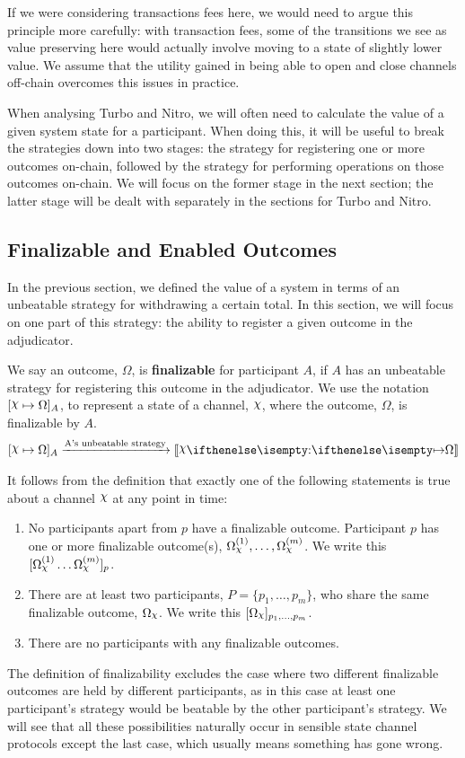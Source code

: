 \documentclass{article}
\begin{document}
If we were considering transactions fees here, we would need to argue this principle more
carefully: with transaction fees, some of the transitions we see as value preserving here
would actually involve moving to a state of slightly lower value. 
We assume that the utility gained in being able to open and close channels off-chain overcomes
this issues in practice.

When analysing Turbo and Nitro, we will often need to calculate the value of a given system
state for a participant.
When doing this, it will be useful to break the strategies down into two stages: the strategy
for registering one or more outcomes on-chain, followed by the strategy for performing operations
on those outcomes on-chain.
We will focus on the former stage in the next section; the latter stage will be dealt with
separately in the sections for Turbo and Nitro.

\subsection{Finalizable and Enabled Outcomes}

In the previous section, we defined the value of a system in terms of an unbeatable strategy
for withdrawing a certain total.
In this section, we will focus on one part of this strategy: the ability to register a given
outcome in the adjudicator.

We say an outcome, $\Omega$, is \textbf{finalizable} for participant $A$, if $A$ has an unbeatable
strategy for registering this outcome in the adjudicator.
We use the notation $\finalizable{\rchi}{\Omega}{A}$, to represent a state of a channel, $\rchi$,
where the outcome, $\Omega$, is finalizable by $A$.
\begin{align*}
  \finalizable{\rchi}{\Omega}{A} \xrightarrow{\text{A's unbeatable strategy}} \adj{\holds{\rchi}{}{}{\Omega}}
\end{align*}

It follows from the definition that exactly one of the following statements is true about
a channel $\rchi$ at any point in time:
\begin{enumerate}
  \item No participants apart from $p$ have a finalizable outcome.
        Participant $p$ has one or more finalizable outcome(s), $\Omega_\rchi^{(1)}, \dots, \Omega_\rchi^{(m)}$.
        We write this $\enf{\Omega_\rchi^{(1)} \dots \Omega_\rchi^{(m)}}_p$.
  \item There are at least two participants, $P = \{p_1, \dots, p_m \}$, who share the same
        finalizable outcome, $\Omega_\rchi$. We write this $\enf{\Omega_\rchi}_{p_1, \dots, p_m}$.
  \item There are no participants with any finalizable outcomes.
\end{enumerate}
The definition of finalizability excludes the case where two different finalizable outcomes are held
by different participants, as in this case at least one participant's strategy would be beatable
by the other participant's strategy.
We will see that all these possibilities naturally occur in sensible state channel protocols
except the last case, which usually means something has gone wrong.
\end{document}
